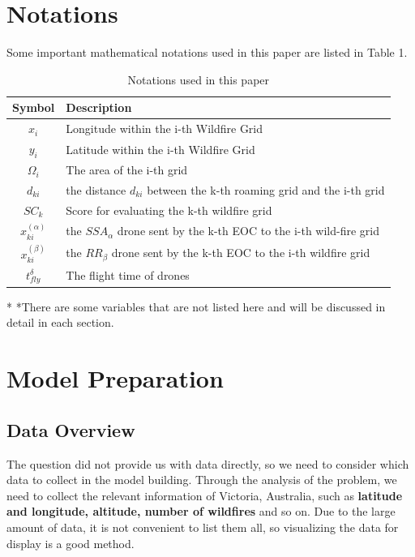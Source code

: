 \documentclass[12pt]{article}  %
\begin{document}
\section{Notations}
Some important mathematical notations used in this paper are listed in Table 1. 
\begin{table}[htbp]
\begin{center}
\caption{Notations used in this paper}
\begin{tabular}{c l}
\toprule[2pt]
\multicolumn{1}{m{3cm}}{\centering Symbol}
&\multicolumn{1}{m{8cm}}{\centering Description }\\
\midrule
$x_i$& Longitude within the i-th Wildfire Grid \\
$y_i$& Latitude within the i-th Wildfire Grid \\
$\varOmega _i$& The area of the i-th grid\\
$d_{ki}$& the distance $d_{ki}$ between the k-th roaming grid and the i-th grid \\
$SC_k$ & Score for evaluating the k-th wildfire grid \\
\vspace{5pt}%
$x^{( \alpha )}_{ki}$ & the $SSA_\alpha$ drone sent by the k-th EOC to the i-th wild-fire grid\\
\vspace{3pt}
$x^{( \beta )}_{ki}$ & the $RR_\beta$ drone sent by the k-th EOC to the i-th wildfire grid\\
$t_{fly}^{\delta}$ & The flight time of drones\\
\bottomrule[2pt]
\end{tabular}\label{tb:notation}
 \begin{tablenotes}
        \footnotesize
        \item[*] *There are some variables that are not listed here and will be discussed in detail in each section. %
      \end{tablenotes}
\end{center}
\end{table}
\vspace{-1cm}%

\section{Model Preparation}
\subsection{Data Overview}
The question did not provide us with data directly, so we need to consider which data to collect in the model building. Through the analysis of the problem, we need to collect the relevant information of Victoria, Australia, such as \textbf{latitude and longitude, altitude, number of wildfires} and so on. Due to the large amount of data, it is not convenient to list them all, so visualizing the data for display is a good method.
\end{document}
